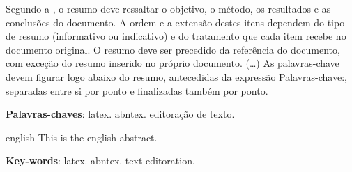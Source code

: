\documentclass[
	12pt,				%
	openright,			%
	oneside,			%
	a4paper,			%
	english,			%
	brazil,				%
	]{abntex2}
\begin{document}



\begin{resumo}
 Segundo a , o resumo deve ressaltar o
 objetivo, o método, os resultados e as conclusões do documento. A ordem e a extensão
 destes itens dependem do tipo de resumo (informativo ou indicativo) e do
 tratamento que cada item recebe no documento original. O resumo deve ser
 precedido da referência do documento, com exceção do resumo inserido no
 próprio documento. (\ldots) As palavras-chave devem figurar logo abaixo do
 resumo, antecedidas da expressão Palavras-chave:, separadas entre si por
 ponto e finalizadas também por ponto.

 \vspace{\onelineskip}
    
 \noindent
 \textbf{Palavras-chaves}: latex. abntex. editoração de texto.
\end{resumo}

\setlength{\absparsep}{18pt} %
\begin{resumo}[Abstract]
 \begin{otherlanguage*}{english}
   This is the english abstract.

   \vspace{\onelineskip}
 
   \noindent 
   \textbf{Key-words}: latex. abntex. text editoration.
 \end{otherlanguage*}
\end{resumo}

\listoffigures*
\cleardoublepage
\end{document}
